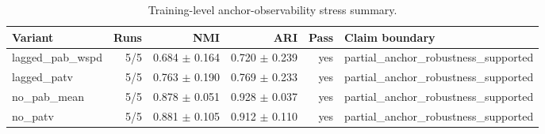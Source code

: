 \begin{table}[H]
\centering
\footnotesize
\setlength{\tabcolsep}{5pt}
\renewcommand{\arraystretch}{1.08}
\caption{Training-level anchor-observability stress summary.}
\begin{tabular}{lrrrrl}
\toprule
Variant & Runs & NMI & ARI & Pass & Claim boundary \\
\midrule
lagged\_pab\_wspd & 5/5 & 0.684 $\pm$ 0.164 & 0.720 $\pm$ 0.239 & yes & partial\_anchor\_robustness\_supported \\
lagged\_patv & 5/5 & 0.763 $\pm$ 0.190 & 0.769 $\pm$ 0.233 & yes & partial\_anchor\_robustness\_supported \\
no\_pab\_mean & 5/5 & 0.878 $\pm$ 0.051 & 0.928 $\pm$ 0.037 & yes & partial\_anchor\_robustness\_supported \\
no\_patv & 5/5 & 0.881 $\pm$ 0.105 & 0.912 $\pm$ 0.110 & yes & partial\_anchor\_robustness\_supported \\
\bottomrule
\end{tabular}
\end{table}
